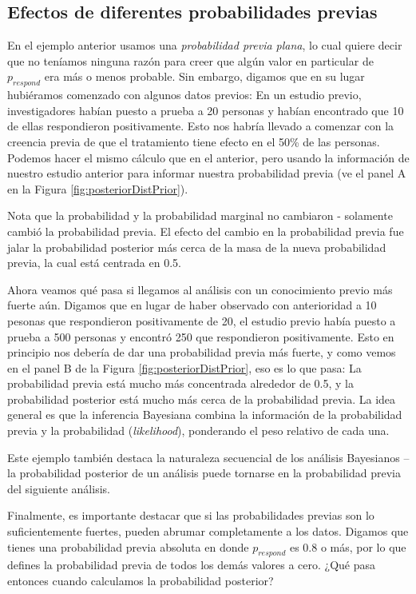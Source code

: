 \documentclass[
  12pt,
]{book}
\begin{document}
\hypertarget{efectos-de-diferentes-probabilidades-previas}{%
\subsection{Efectos de diferentes probabilidades previas}\label{efectos-de-diferentes-probabilidades-previas}}

En el ejemplo anterior usamos una \emph{probabilidad previa plana}, lo cual quiere decir que no teníamos ninguna razón para creer que algún valor en particular de \(p_{respond}\) era más o menos probable. Sin embargo, digamos que en su lugar hubiéramos comenzado con algunos datos previos: En un estudio previo, investigadores habían puesto a prueba a 20 personas y habían encontrado que 10 de ellas respondieron positivamente. Esto nos habría llevado a comenzar con la creencia previa de que el tratamiento tiene efecto en el 50\% de las personas. Podemos hacer el mismo cálculo que en el anterior, pero usando la información de nuestro estudio anterior para informar nuestra probabilidad previa (ve el panel A en la Figura \ref{fig:posteriorDistPrior}).

Nota que la probabilidad y la probabilidad marginal no cambiaron - solamente cambió la probabilidad previa. El efecto del cambio en la probabilidad previa fue jalar la probabilidad posterior más cerca de la masa de la nueva probabilidad previa, la cual está centrada en 0.5.

Ahora veamos qué pasa si llegamos al análisis con un conocimiento previo más fuerte aún. Digamos que en lugar de haber observado con anterioridad a 10 pesonas que respondieron positivamente de 20, el estudio previo había puesto a prueba a 500 personas y encontró 250 que respondieron positivamente. Esto en principio nos debería de dar una probabilidad previa más fuerte, y como vemos en el panel B de la Figura \ref{fig:posteriorDistPrior}, eso es lo que pasa: La probabilidad previa está mucho más concentrada alrededor de 0.5, y la probabilidad posterior está mucho más cerca de la probabilidad previa. La idea general es que la inferencia Bayesiana combina la información de la probabilidad previa y la probabilidad (\emph{likelihood}), ponderando el peso relativo de cada una.

Este ejemplo también destaca la naturaleza secuencial de los análisis Bayesianos -- la probabilidad posterior de un análisis puede tornarse en la probabilidad previa del siguiente análisis.

Finalmente, es importante destacar que si las probabilidades previas son lo suficientemente fuertes, pueden abrumar completamente a los datos. Digamos que tienes una probabilidad previa absoluta en donde \(p_{respond}\) es 0.8 o más, por lo que defines la probabilidad previa de todos los demás valores a cero. ¿Qué pasa entonces cuando calculamos la probabilidad posterior?
\end{document}
